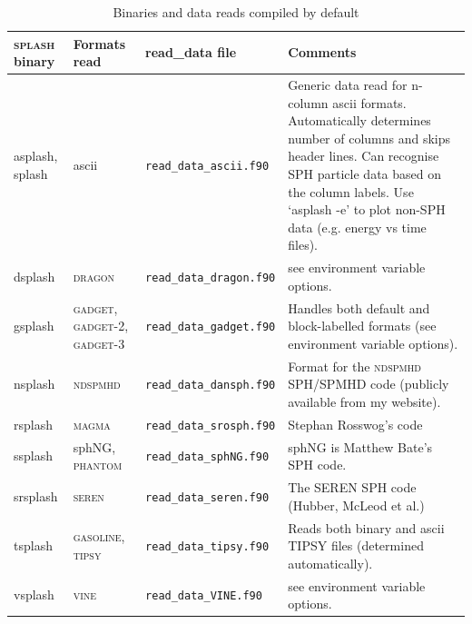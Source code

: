 \documentclass[a4paper,10pt]{article}
\newcommand{\splash}{\textsc{splash }}
\begin{document}
\begin{table}[h!]
\begin{tabular}{lp{}lp{}}
\splash binary & Formats read & read\_data file & Comments \\
\hline
asplash, splash & ascii & \verb+read_data_ascii.f90+ & Generic data read for n-column ascii formats. Automatically determines number of columns and skips header lines. Can recognise SPH particle data based on the column labels. Use `asplash -e' to plot non-SPH data (e.g. energy vs time files).\\
dsplash & \textsc{dragon} & \verb+read_data_dragon.f90+ & see environment variable options. \\
gsplash & \textsc{gadget},  \textsc{gadget-2},  \textsc{gadget-3} &  \verb+read_data_gadget.f90+ & Handles both default and block-labelled formats (see environment variable options). \\
nsplash & \textsc{ndspmhd} & \verb+read_data_dansph.f90+ & Format for the \textsc{ndspmhd} SPH/SPMHD code (publicly available from my website). \\
rsplash & \textsc{magma} & \verb+read_data_srosph.f90+  & Stephan Rosswog's code \\
ssplash & sphNG, \textsc{phantom} & \verb+read_data_sphNG.f90+ & sphNG is Matthew Bate's SPH code. \\
srsplash & \textsc{seren} & \verb+read_data_seren.f90+ & The \textsc{SEREN} SPH code (Hubber, McLeod et al.) \\
tsplash & \textsc{gasoline}, \textsc{tipsy}  &  \verb+read_data_tipsy.f90+ & Reads both binary and ascii TIPSY files (determined automatically). \\
vsplash & \textsc{vine} & \verb+read_data_VINE.f90+ & see environment variable options. \\
\hline
\end{tabular}
\caption{Binaries and data reads compiled by default}
\label{tab:defaultreads}
\end{table}
\end{document}
